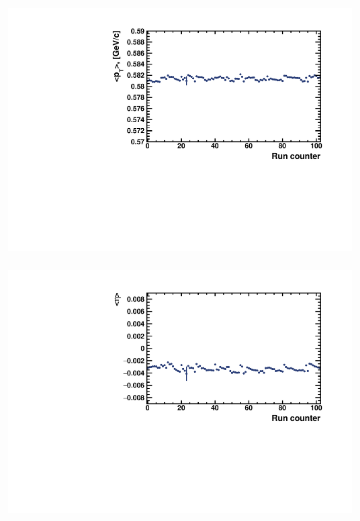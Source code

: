 \begin{figure}[ht]
    \begin{subfigure}{.49\textwidth}
        \centering
        \includegraphics[width=1.\linewidth]{Figures/PtVsRun.pdf}
    \end{subfigure}
    \begin{subfigure}{.49\textwidth}
        \centering
        \includegraphics[width=1.\linewidth]{Figures/EtaVsRun.pdf}
    \end{subfigure}
    \\
    \begin{subfigure}{.49\textwidth}
        \centering

\end{subfigure}
\end{figure}
